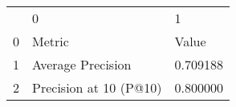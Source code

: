 \begin{tabular}{lll}
 & 0 & 1 \\
0 & Metric & Value \\
1 & Average Precision & 0.709188 \\
2 & Precision at 10 (P@10) & 0.800000 \\
\end{tabular}
